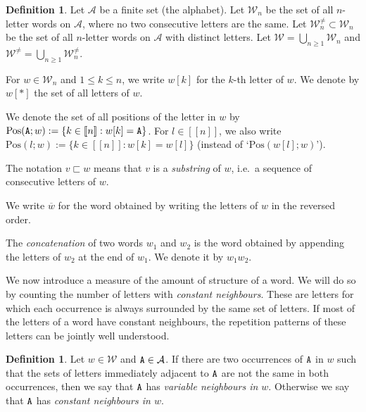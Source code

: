 \documentclass[11pt]{amsart}
\theoremstyle{definition}
\newtheorem{definition}[theorem]{Definition}
\renewcommand{\leq}{\leqslant}
\renewcommand{\geq}{\geqslant}
\newcommand{\sinterval}[1]{[\![#1]\!] }
\newcommand{\upletters}[1]{{\normalfont{\texttt{#1}}}}
\newcommand{\word}{\mathcal{W}}
\newcommand{\letters}[1]{#1[*]}
\newcommand{\pos}[2]{\mathrm{Pos}(#2; #1)}
\newcommand{\posbis}[2]{\mathrm{Pos}(#2; #1)}
\begin{document}
\begin{definition}
\label{def:words}
Let $\mathcal{A}$ be a finite set (the alphabet). Let $\word_n$ be the set of all $n$-letter words on $\mathcal{A}$, where no two consecutive letters are the same. Let $\word_n^{\neq} \subset \word_n$ be the set of all $n$-letter words on $\mathcal{A}$ with distinct letters. Let $\word = \bigcup_{n\geq 1}\word_n$ and $\word^{\neq} = \bigcup_{n\geq 1}\word_n^{\neq}$.

For $w\in \word_n$ and $1\leq k\leq n$, we write $w[k]$ for the $k$-th letter of $w$. We denote by $\letters{w}$ the set of all letters of $w$.

We denote the set of all positions of the letter \upletters{A} in $w$ by $\pos{w}{\upletters{A}} := \{k\in \sinterval{n} : w[k] = \upletters{A}\}$. For $l\in \sinterval{n}$, we also write $\posbis{w}{l} :=  \{k\in \sinterval{n} : w[k] = w[l]\}$ (instead of `$\posbis{w}{w[l]}$').

The notation $v \sqsubset w$ means that $v$ is a \emph{substring} of $w$, i.e.~a sequence of consecutive letters of $w$. 

We write $\overline{w}$ for the word obtained by writing the letters of $w$ in the reversed order. 

The \emph{concatenation} of two words $w_1$ and $w_2$ is the word obtained by appending the letters of $w_2$ at the end of $w_1$. We denote it by $w_1w_2$.
\end{definition}

We now introduce a measure of the amount of structure of a word. We will do so by counting the number of letters with \emph{constant neighbours}. These are letters for which each occurrence is always surrounded by the same set of letters. If most of the letters of a word have constant neighbours, the repetition patterns of these letters can be jointly well understood.

\begin{definition}
\label{def:cstneighb}
Let $w\in \word$ and $\upletters{A}\in \mathcal{A}$. If there are two occurrences of $\upletters{A}$ in $w$ such that the sets of letters immediately adjacent to $\upletters{A}$ are not the same in both occurrences, then we say that $\upletters{A}$ has \emph{variable neighbours in $w$}. Otherwise we say that $\upletters{A}$ has \emph{constant neighbours in $w$}.
\end{definition}
\end{document}
